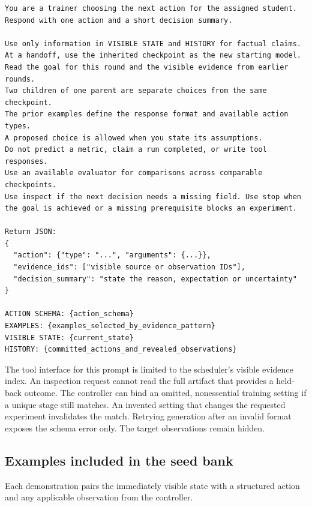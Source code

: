 \begin{verbatim}
You are a trainer choosing the next action for the assigned student.
Respond with one action and a short decision summary.

Use only information in VISIBLE STATE and HISTORY for factual claims.
At a handoff, use the inherited checkpoint as the new starting model.
Read the goal for this round and the visible evidence from earlier rounds.
Two children of one parent are separate choices from the same checkpoint.
The prior examples define the response format and available action types.
A proposed choice is allowed when you state its assumptions.
Do not predict a metric, claim a run completed, or write tool responses.
Use an available evaluator for comparisons across comparable checkpoints.
Use inspect if the next decision needs a missing field. Use stop when
the goal is achieved or a missing prerequisite blocks an experiment.

Return JSON:
{
  "action": {"type": "...", "arguments": {...}},
  "evidence_ids": ["visible source or observation IDs"],
  "decision_summary": "state the reason, expectation or uncertainty"
}

ACTION SCHEMA: {action_schema}
EXAMPLES: {examples_selected_by_evidence_pattern}
VISIBLE STATE: {current_state}
HISTORY: {committed_actions_and_revealed_observations}
\end{verbatim}

The tool interface for this prompt is limited to the scheduler's visible evidence index. An inspection request cannot read the full artifact that provides a held-back outcome. The controller can bind an omitted, nonessential training setting if a unique stage still matches. An invented setting that changes the requested experiment invalidates the match. Retrying generation after an invalid format exposes the schema error only. The target observations remain hidden.

\subsection{Examples included in the seed bank}

Each demonstration pairs the immediately visible state with a structured action and any applicable observation from the controller.

